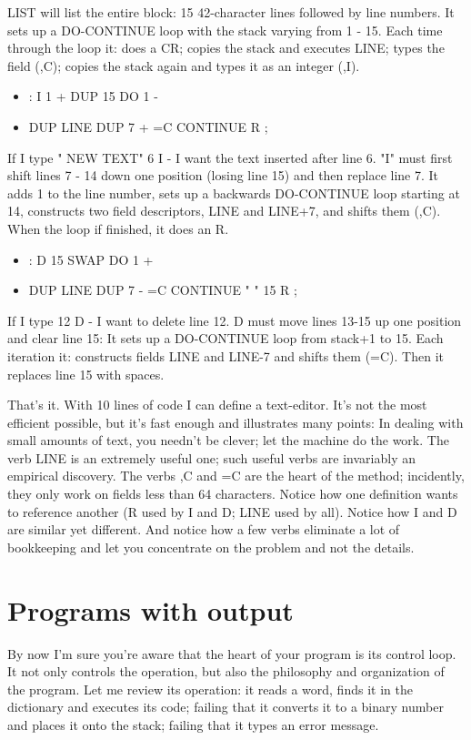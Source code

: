 \documentclass[b5paper, oneside]{book}
\begin{document}
LIST will list the entire block: 15 42-character lines followed by line numbers. It sets up a DO-CONTINUE loop with the stack varying from 1 - 15. Each time through the loop it: does a CR; copies the stack and executes LINE; types the field (,C); copies the stack again and types it as an integer (,I).\begin{itemize}
   \item : I 1 + DUP 15 DO 1 -
   \item DUP LINE DUP 7 + =C CONTINUE R ;\end{itemize}
If I type " NEW TEXT" 6 I - I want the text inserted after line 6. "I" must first shift lines 7 - 14 down one position (losing line 15) and then replace line 7. It adds 1 to the line number, sets up a backwards DO-CONTINUE loop starting at 14, constructs two field descriptors, LINE and LINE+7, and shifts them (,C). When the loop if finished, it does an R.\begin{itemize}
   \item : D 15 SWAP DO 1 +
   \item DUP LINE DUP 7 - =C CONTINUE "  " 15 R ;\end{itemize}
If I type 12 D - I want to delete line 12. D must move lines 13-15 up one position and clear line 15: It sets up a DO-CONTINUE loop from stack+1 to 15. Each iteration it: constructs fields LINE and LINE-7 and shifts them (=C). Then it replaces line 15 with spaces.

That's it. With 10 lines of code I can define a text-editor. It's not the most efficient possible, but it's fast enough and illustrates many points: In dealing with small amounts of text, you needn't be clever; let the machine do the work. The verb LINE is an extremely useful one; such useful verbs are invariably an empirical discovery. The verbs ,C and =C are the heart of the method; incidently, they only work on fields less than 64 characters. Notice how one definition wants to reference another (R used by I and D; LINE used by all). Notice how I and D are similar yet different. And notice how a few verbs eliminate a lot of bookkeeping and let you concentrate on the problem and not the details.



\chapter{Programs with output}
By now I'm sure you're aware that the heart of your program is its control loop. It not only controls the operation, but also the philosophy and organization of the program. Let me review its operation: it reads a word, finds it in the dictionary and executes its code; failing that it converts it to a binary number and places it onto the stack; failing that it types an error message.
\end{document}
